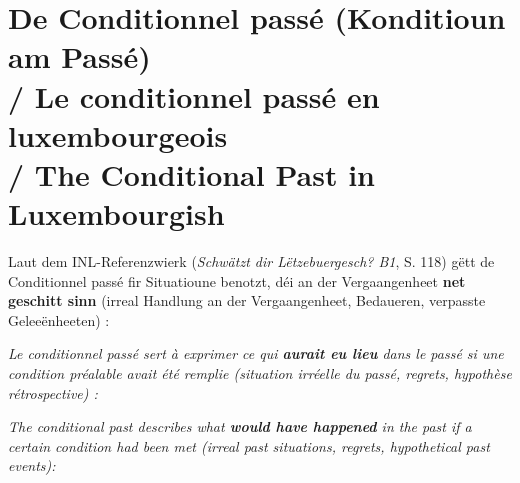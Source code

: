 \vspace{1.5em}

\section[De Conditionnel passé / Conditional Past]{De Conditionnel passé (Konditioun am Passé) \\/ Le conditionnel passé en luxembourgeois \\/ The Conditional Past in Luxembourgish}

Laut dem INL-Referenzwierk (\textit{Schwätzt dir Lëtzebuergesch? B1}, S. 118) gëtt de Conditionnel passé fir Situatioune benotzt, déi an der Vergaangenheet \textbf{net geschitt sinn} (irreal Handlung an der Vergaangenheet, Bedaueren, verpasste Geleeënheeten) :

\textit{Le conditionnel passé sert à exprimer ce qui \textbf{aurait eu lieu} dans le passé si une condition préalable avait été remplie (situation irréelle du passé, regrets, hypothèse rétrospective) :}

\textit{The conditional past describes what \textbf{would have happened} in the past if a certain condition had been met (irreal past situations, regrets, hypothetical past events):}

\begin{center}
\end{center}

\vspace{0.6em}

